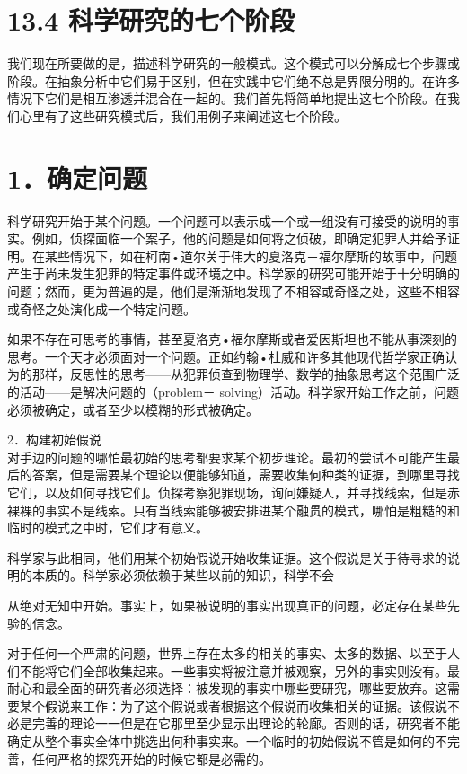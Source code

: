 \section*{13.4 科学研究的七个阶段}
我们现在所要做的是，描述科学研究的一般模式。这个模式可以分解成七个步骤或阶段。在抽象分析中它们易于区别，但在实践中它们绝不总是界限分明的。在许多情况下它们是相互渗透并混合在一起的。我们首先将简单地提出这七个阶段。在我们心里有了这些研究模式后，我们用例子来阐述这七个阶段。

\section*{1．确定问题}
科学研究开始于某个问题。一个问题可以表示成一个或一组没有可接受的说明的事实。例如，侦探面临一个案子，他的问题是如何将之侦破，即确定犯罪人并给予证明。在某些情况下，如在柯南•道尔关于伟大的夏洛克－福尔摩斯的故事中，问题产生于尚未发生犯罪的特定事件或环境之中。科学家的研究可能开始于十分明确的问题；然而，更为普遍的是，他们是渐渐地发现了不相容或奇怪之处，这些不相容或奇怪之处演化成一个特定问题。

如果不存在可思考的事情，甚至夏洛克•福尔摩斯或者爱因斯坦也不能从事深刻的思考。一个天才必须面对一个问题。正如约翰•杜威和许多其他现代哲学家正确认为的那样，反思性的思考——从犯罪侦查到物理学、数学的抽象思考这个范围广泛的活动——是解决问题的（problem－ solving）活动。科学家开始工作之前，问题必须被确定，或者至少以模糊的形式被确定。

2．构建初始假说\\
对手边的问题的哪怕最初始的思考都要求某个初步理论。最初的尝试不可能产生最后的答案，但是需要某个理论以便能够知道，需要收集何种类的证据，到哪里寻找它们，以及如何寻找它们。侦探考察犯罪现场，询问嫌疑人，并寻找线索，但是赤裸裸的事实不是线索。只有当线索能够被安排进某个融贯的模式，哪怕是粗糙的和临时的模式之中时，它们才有意义。

科学家与此相同，他们用某个初始假说开始收集证据。这个假说是关于待寻求的说明的本质的。科学家必须依赖于某些以前的知识，科学不会

从绝对无知中开始。事实上，如果被说明的事实出现真正的问题，必定存在某些先验的信念。

对于任何一个严肃的问题，世界上存在太多的相关的事实、太多的数据、以至于人们不能将它们全部收集起来。一些事实将被注意并被观察，另外的事实则没有。最耐心和最全面的研究者必须选择：被发现的事实中哪些要研究，哪些要放弃。这需要某个假说来工作：为了这个假说或者根据这个假说而收集相关的证据。该假说不必是完善的理论一一但是在它那里至少显示出理论的轮廊。否则的话，研究者不能确定从整个事实全体中挑选出何种事实来。一个临时的初始假说不管是如何的不完善，任何严格的探究开始的时候它都是必需的。

